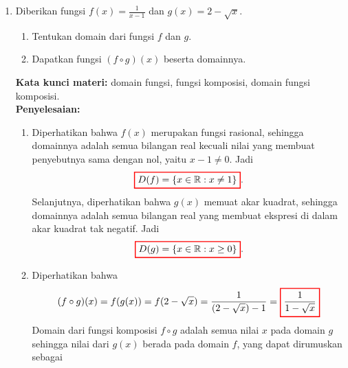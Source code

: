\documentclass[10pt,openany,a4paper]{article}
\theoremstyle{definition}
\theoremstyle{definition}
\theoremstyle{plain}
\newenvironment{jawab}[2][tes]{
\textbf{Kata kunci materi:} #1.\\
\textbf{Penyelesaian:} #2
}{}
\begin{document}
\begin{enumerate}
\begin{jawab}[pertidaksamaan rasional, pecahan, garis bilangan, notasi interval]
{\begin{center}
\begin{tikzpicture}
\end{tikzpicture}
        \end{center}
        Karena yang diminta adalah nilai \(x\) yang membuat pertidaksamaan \eqref{ineq:soal1} kurang dari nol, maka solusi dari pertidaksamaan tersebut adalah \(-8 < x < 2\). Dalam notasi interval, solusi tersebut dapat ditulis sebagai $\colorlet{oldcolor}{.}
        \color{red}
        \setlength{\fboxrule}{1pt} \boxed{\color{oldcolor}(-8, 2)}\color{oldcolor}$.}
    \end{jawab}
    \item Diberikan fungsi \(f(x) = \frac{1}{x-1}\) dan \(g(x) = 2 - \sqrt{x}\).
    \begin{enumerate}
        \item Tentukan domain dari fungsi \(f\) dan \(g\).
        \item Dapatkan fungsi \((f \circ g)(x)\) beserta domainnya.
    \end{enumerate}
    \begin{jawab}[domain fungsi, fungsi komposisi, domain fungsi komposisi]{
        \begin{enumerate}
            \item Diperhatikan bahwa $f(x)$ merupakan fungsi rasional, sehingga domainnya adalah semua bilangan real kecuali nilai yang membuat penyebutnya sama dengan nol, yaitu $x-1\neq 0$. Jadi
            \[
            \colorlet{oldcolor}{.}
        \color{red}
        \setlength{\fboxrule}{1pt} \boxed{\color{oldcolor}D(f)=\{x \in \mathbb{R} : x \neq 1\}}\color{oldcolor}.
            \]
            Selanjutnya, diperhatikan bahwa $g(x)$ memuat akar kuadrat, sehingga domainnya adalah semua bilangan real yang membuat ekspresi di dalam akar kuadrat tak negatif. Jadi 
            \[
            \colorlet{oldcolor}{.}
        \color{red}
        \setlength{\fboxrule}{1pt} \boxed{\color{oldcolor}D(g)=\{x \in \mathbb{R} : x \geq 0\}}\color{oldcolor}.
            \]
            \item Diperhatikan bahwa 
            \begin{align*}
                (f\circ g)(x) = f(g(x)) = f(2 - \sqrt{x}) = \frac{1}{(2 - \sqrt{x}) - 1} = 
                \colorlet{oldcolor}{.}
        \color{red}
        \setlength{\fboxrule}{1pt} \boxed{\color{oldcolor}\frac{1}{1 - \sqrt{x}}}\color{oldcolor}
            \end{align*}
            Domain dari fungsi komposisi $f\circ g$ adalah semua nilai $x$ pada domain $g$ sehingga nilai dari $g(x)$ berada pada domain $f$, yang dapat dirumuskan sebagai 

\end{enumerate}}
\end{jawab}
\end{enumerate}
\end{document}
